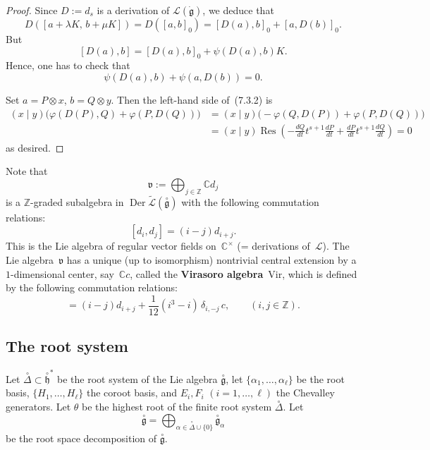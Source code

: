 \documentclass[12pt]{article}
\begin{document}
\begin{proof}
Since $D := d_s$ is a derivation of $\mathcal{L}(\dot{\mathfrak{g}})$, we deduce that
\[
D([a + \lambda K,\, b + \mu K]) 
= D([a,b]_0) = [D(a),b]_0 + [a,D(b)]_0.
\]
But
\[
[D(a),b] = [D(a),b]_0 + \psi(D(a),b)K.
\]
Hence, one has to check that
\begin{equation}
\psi(D(a),b) + \psi(a,D(b)) = 0.
\tag{7.3.2}
\end{equation}

Set $a = P \otimes x$, $b = Q \otimes y$.
Then the left-hand side of~(7.3.2) is
\begin{align*}
(x\mid y)\big(\varphi(D(P),Q) + \varphi(P,D(Q))\big)
&= (x\mid y)\big(-\varphi(Q,D(P)) + \varphi(P,D(Q))\big) \\
&= (x\mid y)\operatorname{Res}\!\left(
    -\frac{dQ}{dt}t^{s+1}\frac{dP}{dt} 
    + \frac{dP}{dt}t^{s+1}\frac{dQ}{dt}
  \right) = 0
\end{align*}
as desired.
\end{proof}
Note that
\[
\mathfrak{v} := \bigoplus_{j \in \mathbb{Z}} \mathbb{C} d_j
\]
is a $\mathbb{Z}$-graded subalgebra in $\operatorname{Der}\widetilde{\mathcal{L}}(\overset{\circ}{\mathfrak{g}})$
with the following commutation relations:
\[
[d_i, d_j] = (i - j)d_{i+j}.
\]
This is the Lie algebra of regular vector fields on~$\mathbb{C}^\times$ 
(= derivations of~$\mathcal{L}$). The Lie algebra~$\mathfrak{v}$ has a unique (up to isomorphism) nontrivial central extension
by a $1$-dimensional center, say~$\mathbb{C}c$, called the \textbf{Virasoro algebra}~$\mathrm{Vir}$,
which is defined by the following commutation relations:
\begin{equation}
[d_i, d_j] = (i - j)d_{i+j} + \frac{1}{12}(i^3 - i)\,\delta_{i,-j}\,c,
\qquad (i,j \in \mathbb{Z}).
\tag{7.3.3}
\end{equation}

\subsection{The root system}
Let $\overset{\circ}{\Delta} \subset \overset{\circ}{\mathfrak{h}}^*$ be the root system of the Lie algebra 
$\overset{\circ}{\mathfrak{g}}$, let $\{\alpha_1,\dots,\alpha_\ell\}$ be the root basis, 
$\{H_1,\dots,H_\ell\}$ the coroot basis, and $E_i, F_i$ $(i=1,\dots,\ell)$ the Chevalley generators.  
Let $\theta$ be the highest root of the finite root system $\overset{\circ}{\Delta}$.
Let
\[
\overset{\circ}{\mathfrak{g}}
= \bigoplus_{\alpha \in \overset{\circ}{\Delta} \cup \{0\}} 
  \overset{\circ}{\mathfrak{g}}_\alpha
\]
be the root space decomposition of $\overset{\circ}{\mathfrak{g}}$.
\end{document}

